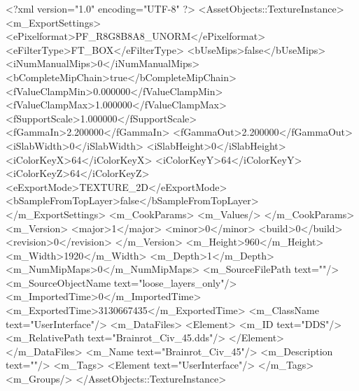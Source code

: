 <?xml version="1.0" encoding="UTF-8" ?>
<AssetObjects::TextureInstance>
	<m_ExportSettings>
		<ePixelformat>PF_R8G8B8A8_UNORM</ePixelformat>
		<eFilterType>FT_BOX</eFilterType>
		<bUseMips>false</bUseMips>
		<iNumManualMips>0</iNumManualMips>
		<bCompleteMipChain>true</bCompleteMipChain>
		<fValueClampMin>0.000000</fValueClampMin>
		<fValueClampMax>1.000000</fValueClampMax>
		<fSupportScale>1.000000</fSupportScale>
		<fGammaIn>2.200000</fGammaIn>
		<fGammaOut>2.200000</fGammaOut>
		<iSlabWidth>0</iSlabWidth>
		<iSlabHeight>0</iSlabHeight>
		<iColorKeyX>64</iColorKeyX>
		<iColorKeyY>64</iColorKeyY>
		<iColorKeyZ>64</iColorKeyZ>
		<eExportMode>TEXTURE_2D</eExportMode>
		<bSampleFromTopLayer>false</bSampleFromTopLayer>
	</m_ExportSettings>
	<m_CookParams>
		<m_Values/>
	</m_CookParams>
	<m_Version>
		<major>1</major>
		<minor>0</minor>
		<build>0</build>
		<revision>0</revision>
	</m_Version>
	<m_Height>960</m_Height>
	<m_Width>1920</m_Width>
	<m_Depth>1</m_Depth>
	<m_NumMipMaps>0</m_NumMipMaps>
	<m_SourceFilePath text=""/>
	<m_SourceObjectName text="loose_layers_only"/>
	<m_ImportedTime>0</m_ImportedTime>
	<m_ExportedTime>3130667435</m_ExportedTime>
	<m_ClassName text="UserInterface"/>
	<m_DataFiles>
		<Element>
			<m_ID text="DDS"/>
			<m_RelativePath text="Brainrot_Civ_45.dds"/>
		</Element>
	</m_DataFiles>
	<m_Name text="Brainrot_Civ_45"/>
	<m_Description text=""/>
	<m_Tags>
		<Element text="UserInterface"/>
	</m_Tags>
	<m_Groups/>
</AssetObjects::TextureInstance>

